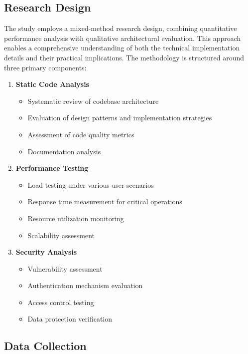 \documentclass{article}
\begin{document}
\subsection{Research Design}

The study employs a mixed-method research design, combining quantitative performance analysis with qualitative architectural evaluation. This approach enables a comprehensive understanding of both the technical implementation details and their practical implications. The methodology is structured around three primary components:

\begin{enumerate}
    \item \textbf{Static Code Analysis}
    \begin{itemize}
        \item Systematic review of codebase architecture
        \item Evaluation of design patterns and implementation strategies
        \item Assessment of code quality metrics
        \item Documentation analysis
    \end{itemize}

    \item \textbf{Performance Testing}
    \begin{itemize}
        \item Load testing under various user scenarios
        \item Response time measurement for critical operations
        \item Resource utilization monitoring
        \item Scalability assessment
    \end{itemize}

    \item \textbf{Security Analysis}
    \begin{itemize}
        \item Vulnerability assessment
        \item Authentication mechanism evaluation
        \item Access control testing
        \item Data protection verification
    \end{itemize}
\end{enumerate}

\subsection{Data Collection}
\end{document}
